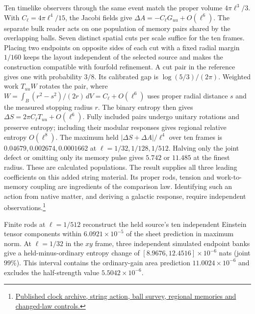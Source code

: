 \documentclass[11pt]{article}
\begin{document}
Ten timelike observers through the same event match the proper volume
$4\pi\ell^3/3$. With $C_\ell=4\pi\ell^4/15$, the Jacobi fields give
$\Delta A=-C_\ell G_{uu}+O(\ell^6)$. The separate bulk reader acts on
one population of memory pairs shared by the overlapping balls. Seven
distinct spatial cuts per scale suffice for the ten frames. Placing
two endpoints on opposite sides of each cut with a fixed radial
margin $1/160$ keeps the layout independent of the selected source
and makes the construction compatible with fourfold refinement. A cut
pair in the reference gives one with probability $3/8$. Its calibrated
gap is $\log(5/3)/(2\pi)$. Weighted work $T_{uu}W$ rotates the pair,
where $W=\int_B(r^2-s^2)/(2r)\,dV=C_\ell+O(\ell^6)$ uses proper
radial distance $s$ and the measured stopping radius $r$. The binary
entropy then gives $\Delta S=2\pi C_\ell T_{uu}+O(\ell^6)$. Fully
included pairs undergo unitary rotations and preserve entropy; including
their modular responses gives regional relative entropy $O(\ell^8)$.
The maximum held $|\Delta S+\Delta A|/\ell^4$ over ten frames is
$0.04679,0.002674,0.0001662$ at $\ell=1/32,1/128,1/512$.
Halving only the joint defect or omitting only its memory pulse gives
$5.742$ or $11.485$ at the finest radius. These are calculated
populations. The result supplies all three leading coefficients on this
added string material. Its proper rods, tension and work-to-memory
coupling are ingredients of the comparison law. Identifying such an
action from native matter, and deriving a galactic response, require
independent observations.\footnote{\href{https://github.com/FloatingPragma/observer-patch-holography/tree/main/model/candidate_laws/interval_echo_partition_repair/published_strings}{Published clock archive, string action, ball survey, regional memories and changed-law controls.}}

Finite rods at $\ell=1/512$ reconstruct the held source's ten independent
Einstein tensor components within $6.0921\times10^{-5}$ of the sheet
prediction in maximum norm. At $\ell=1/32$ in the $xy$ frame,
three independent simulated endpoint banks give a held-minus-ordinary
entropy change of $[8.9676,12.4516]\times10^{-6}$ nats (joint $99\%$).
This interval contains the ordinary-gain area prediction
$11.0024\times10^{-6}$ and excludes the half-strength value
$5.5042\times10^{-6}$.
\end{document}
